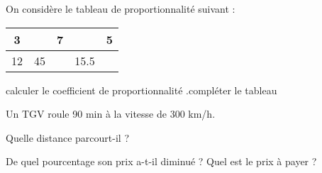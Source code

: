 \documentclass[a4paper,addpoints,12pt]{exam}
\begin{document}
\devoir[sem=2,prv=false,ds=true,num=6 ,niv=2 ,date=,Rdate=]


\begin{exo}[4]
On considère le tableau de proportionnalité suivant :
\begin{tabular}{|c|c|c|c|c|}
\hline 
3 &  & 7 &  & 5 \\ 
\hline 
12 & 45 &  & 15.5 &  \\ 
\hline 
\end{tabular} 
\begin{questions}
\question calculer le coefficient de proportionnalité .\anserline[1]
\question compléter le tableau 
\end{questions}
\end{exo}


\begin{exo}[2]
\begin{minipage}{.5\linewidth}
Un TGV roule  90 min  à la vitesse de 300 km/h.

Quelle distance parcourt-il ?
\end{minipage}
\begin{minipage}{.5\linewidth}
\anserline[3]
\end{minipage}

\end{exo}

\begin{exo}[4]
\begin{minipage}{.5\linewidth}
\begin{questions}
\question  De quel pourcentage son prix a-t-il diminué ?
\question Quel est le prix à payer ?
\end{questions}
\end{minipage}
\begin{minipage}{.5\linewidth}
\anserline[8]
\end{minipage}
\end{exo}
\newpage
\end{document}
